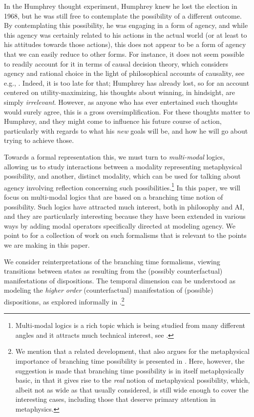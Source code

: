 \documentclass{article}
\begin{document}
In the Humphrey thought experiment, Humphrey knew he lost the election in 1968, but he was still free to contemplate the possibility of a different outcome. By contemplating this possibility, he was engaging in a form of agency, and while this agency was certainly related to his actions in the actual world (or at least to his attitudes towards those actions), this does not appear to be a form of agency that we can easily reduce to other forms. For instance, it does not seem possible to readily account for it in terms of causal decision theory, which considers agency and rational choice in the light of philosophical accounts of causality, see e.g., \cite{joyce}. Indeed, it is too late for that; Humphrey has already lost, so for an account centered on utility-maximizing, his thoughts about winning, in hindsight, are simply \emph{irrelevant}. However, as anyone who has ever entertained such thoughts would surely agree, this is a gross oversimplification. For these thoughts matter to Humphrey, and they might come to influence his future course of action, particularly with regards to what his \emph{new} goals will be, and how he will go about trying to achieve those.

Towards a formal representation this, we must turn to \emph{multi-modal} logics, allowing us to study interactions between a modality representing metaphysical possibility, and another, distinct modality, which can be used for talking about agency involving reflection concerning such possibilities.\footnote{Multi-modal logics is a rich topic which is being studied from many different angles and it attracts much technical interest, see \cite{multimod}.} In this paper, we will focus on multi-modal logics that are based on a branching time notion of possibility. Such logics have attracted much interest, both in philosophy and AI, and they are particularly interesting because they have been extended in various ways by adding modal operators specifically directed at modeling agency. We point to \cite{stit,dstit,atl,atle,nctl,stitstart} for a collection of work on such formalisms that is relevant to the points we are making in this paper.

We consider reinterpretations of the branching time formalisms, viewing transitions between states as resulting from the (possibly counterfactual) manifestations of dispositions. The temporal dimension can be understood as modeling the \emph{higher order} (counterfactual) manifestation of (possible) dispositions, as explored informally in \cite{dispmod}.\footnote{We mention that a related development, that also argues for the metaphysical importance of branching time possibility is presented in \cite{realmod}. Here, however, the suggestion is made that branching time possibility is in itself metaphysically basic, in that it gives rise to the \emph{real} notion of metaphysical possibility, which, albeit not as wide as that usually considered, is still wide enough to cover the interesting cases, including those that deserve primary attention in metaphysics.}
\end{document}
